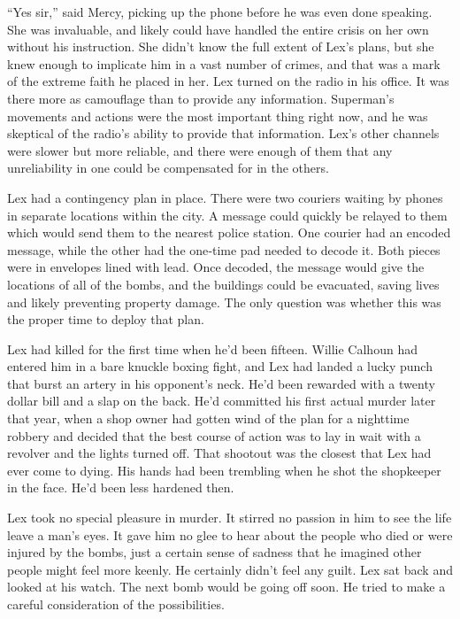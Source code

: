 \documentclass[ebook,12pt]{memoir}
\begin{document}
``Yes sir,'' said Mercy, picking up the phone before he was even done
speaking. She was invaluable, and likely could have handled the entire
crisis on her own without his instruction. She didn't know the full
extent of Lex's plans, but she knew enough to implicate him in a vast
number of crimes, and that was a mark of the extreme faith he placed in
her. Lex turned on the radio in his office. It was there more as
camouflage than to provide any information. Superman's movements and
actions were the most important thing right now, and he was skeptical of
the radio's ability to provide that information. Lex's other channels
were slower but more reliable, and there were enough of them that any
unreliability in one could be compensated for in the others.

Lex had a contingency plan in place. There were two couriers waiting by
phones in separate locations within the city. A message could quickly be
relayed to them which would send them to the nearest police station. One
courier had an encoded message, while the other had the one‐time pad
needed to decode it. Both pieces were in envelopes lined with lead. Once
decoded, the message would give the locations of all of the bombs, and
the buildings could be evacuated, saving lives and likely preventing
property damage. The only question was whether this was the proper time
to deploy that plan.

Lex had killed for the first time when he'd been fifteen. Willie Calhoun
had entered him in a bare knuckle boxing fight, and Lex had landed a
lucky punch that burst an artery in his opponent's neck. He'd been
rewarded with a twenty dollar bill and a slap on the back. He'd
committed his first actual murder later that year, when a shop owner had
gotten wind of the plan for a nighttime robbery and decided that the
best course of action was to lay in wait with a revolver and the lights
turned off. That shootout was the closest that Lex had ever come to
dying. His hands had been trembling when he shot the shopkeeper in the
face. He'd been less hardened then.

Lex took no special pleasure in murder. It stirred no passion in him to
see the life leave a man's eyes. It gave him no glee to hear about the
people who died or were injured by the bombs, just a certain sense of
sadness that he imagined other people might feel more keenly. He
certainly didn't feel any guilt. Lex sat back and looked at his watch.
The next bomb would be going off soon. He tried to make a careful
consideration of the possibilities.
\end{document}
